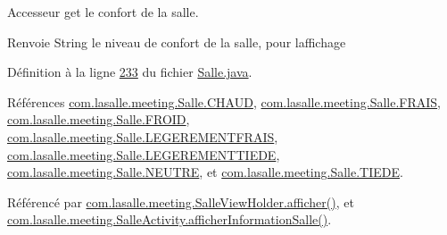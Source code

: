 Accesseur get le confort de la salle. 

\begin{DoxyReturn}{Renvoie}
String le niveau de confort de la salle, pour l\textquotesingle{}affichage 
\end{DoxyReturn}


Définition à la ligne \hyperlink{_salle_8java_source_l00233}{233} du fichier \hyperlink{_salle_8java_source}{Salle.\+java}.



Références \hyperlink{_salle_8java_source_l00029}{com.\+lasalle.\+meeting.\+Salle.\+C\+H\+A\+UD}, \hyperlink{_salle_8java_source_l00024}{com.\+lasalle.\+meeting.\+Salle.\+F\+R\+A\+IS}, \hyperlink{_salle_8java_source_l00023}{com.\+lasalle.\+meeting.\+Salle.\+F\+R\+O\+ID}, \hyperlink{_salle_8java_source_l00025}{com.\+lasalle.\+meeting.\+Salle.\+L\+E\+G\+E\+R\+E\+M\+E\+N\+T\+F\+R\+A\+IS}, \hyperlink{_salle_8java_source_l00027}{com.\+lasalle.\+meeting.\+Salle.\+L\+E\+G\+E\+R\+E\+M\+E\+N\+T\+T\+I\+E\+DE}, \hyperlink{_salle_8java_source_l00026}{com.\+lasalle.\+meeting.\+Salle.\+N\+E\+U\+T\+RE}, et \hyperlink{_salle_8java_source_l00028}{com.\+lasalle.\+meeting.\+Salle.\+T\+I\+E\+DE}.



Référencé par \hyperlink{_salle_view_holder_8java_source_l00077}{com.\+lasalle.\+meeting.\+Salle\+View\+Holder.\+afficher()}, et \hyperlink{_salle_activity_8java_source_l00103}{com.\+lasalle.\+meeting.\+Salle\+Activity.\+afficher\+Information\+Salle()}.



